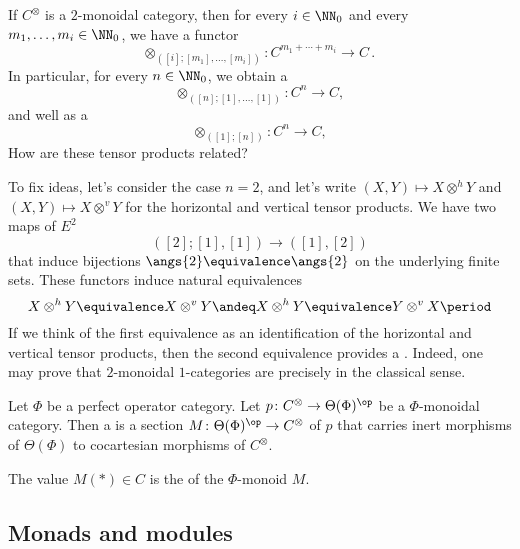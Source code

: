 \begin{eg}
	If $ C^{\otimes} $ is a $2$-monoidal category,
	then for every $ i \in \NN_0 $ and
	every $ m_1, \ldots, m_i \in \NN_0 $,
	we have a functor
	\[
		\otimes_{([i];[m_1],\ldots,[m_i])} \colon
		C^{m_1+\cdots+m_i} \to C \period
	\]
	In particular, for every $ n \in \NN_0 $,
	we obtain a 
	\[
		\otimes_{([n];[1],\ldots,[1])} \colon C^n \to C \comma
	\]
	and well as a 
	\[
		\otimes_{([1];[n])} \colon C^n \to C \comma
	\]
	How are these tensor products related?

	To fix ideas, let's consider the case $ n = 2 $,
	and let's write $ (X,Y) \mapsto X \otimes^h Y $
	and $ (X,Y) \mapsto X \otimes^v Y $
	for the horizontal and vertical tensor products.
	We have two maps of  $ E^2 $
	\[
		([2];[1],[1]) \to ([1],[2])
	\]
	that induce bijections $ \angs{2} \equivalence \angs{2} $
	on the underlying finite sets.
	These functors induce natural equivalences
	\[
		X \otimes^h Y \equivalence X \otimes^v Y \andeq
		X \otimes^h Y \equivalence Y \otimes^v X \period
	\]
	If we think of the first equivalence as
	an identification of the horizontal
	and vertical tensor products,
	then the second equivalence provides a .
	Indeed, one may prove that $2$-monoidal $1$-categories
	are precisely 
	in the classical sense.
\end{eg}

\begin{definition}
	Let $ \Phi $ be a perfect operator category.
	Let $ p \colon C^{\otimes} \to \Theta(\Phi)^{\op} $ be
	a $ \Phi $-monoidal category.
	Then a 
	is a section $ M \colon \Theta(\Phi)^{\op} \to C^{\otimes} $
	of $ p $  that carries inert morphisms of $ \Theta(\Phi) $
	to cocartesian morphisms of $ C^{\otimes} $.

	The value $ M(\ast) \in C $ is the 
	of the $ \Phi $-monoid $ M $.
\end{definition}

\subsection{Monads and modules}%
\label{sub:monads_and_modules}

